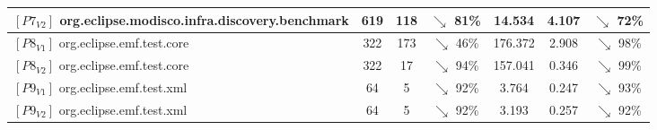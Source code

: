 \begin{table}
\begin{tabular}{lcccccc}
		$[P7_{V2}]$ org.eclipse.modisco.infra.discovery.benchmark& 619 & 118 & \cellcolor{green!35}$\searrow$ 81\%  & 14.534 &4.107  & \cellcolor{green!25}$\searrow$ 72\% \\%
		\midrule
		
		$[P8_{V1}]$ org.eclipse.emf.test.core& 322 & 173 & \cellcolor{green!10}$\searrow$ 46\%  & 176.372 & 2.908 & \cellcolor{green!40}$\searrow$ 98\%  \\ 
		\midrule
		
		$[P8_{V2}]$ org.eclipse.emf.test.core& 322 & 17 & \cellcolor{green!40}$\searrow$ 94\%  & 157.041& 0.346 & \cellcolor{green!40}$\searrow$ 99\%  \\ 
		
		\midrule
		
		$[P9_{V1}]$ org.eclipse.emf.test.xml& 64 & 5 & \cellcolor{green!40}$\searrow$ 92\%  & 3.764 & 0.247 & \cellcolor{green!40}$\searrow$ 93\%  \\ 
		\midrule
		
		$[P9_{V2}]$ org.eclipse.emf.test.xml& 64 & 5 & \cellcolor{green!40}$\searrow$ 92\%  & 3.193 & 0.257 & \cellcolor{green!40}$\searrow$ 92\%  \\ 
		
		
		
		\bottomrule		
	\end{tabular}

\end{table}

